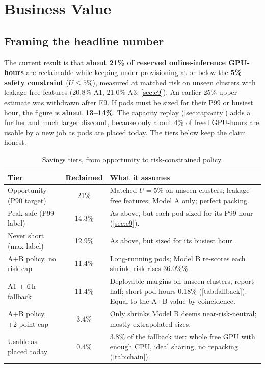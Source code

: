 \section{Business Value}
\label{sec:value}

\subsection{Framing the headline number}
The current result is that \textbf{about 21\% of reserved online-inference GPU-hours} are reclaimable while keeping under-provisioning at or below the \textbf{5\% safety constraint} ($U \le 5\%$), measured at matched risk on unseen clusters with leakage-free features (20.8\% A1, 21.0\% A3; \cref{sec:e9}). An earlier 25\% upper estimate was withdrawn after E9. If pods must be sized for their P99 or busiest hour, the figure is \textbf{about 13--14\%}. The capacity replay (\cref{sec:capacity}) adds a further and much larger discount, because only about 4\% of freed GPU-hours are usable by a new job as pods are placed today. The tiers below keep the claim honest:

\begin{table}[h]
\centering\small
\caption{Savings tiers, from opportunity to risk-constrained policy.}
\label{tab:tiers}
\begin{tabularx}{\linewidth}{@{}p{4.1cm}cL@{}}
\toprule
Tier & Reclaimed & What it assumes \\
\midrule
Opportunity (P90 target) & 21\% & Matched $U=5\%$ on unseen clusters; leakage-free features; Model A only; perfect packing. \\
Peak-safe (P99 label) & 14.3\% & As above, but each pod sized for its P99 hour (\cref{sec:e9}). \\
Never short (max label) & 12.9\% & As above, but sized for its busiest hour. \\
A+B policy, no risk cap & 11.4\% & Long-running pods; Model B re-scores each shrink; risk rises 36.0\%\%. \\
A1 + 6\,h fallback & 11.4\% & Deployable margins on unseen clusters, report half; short pod-hours 0.18\% (\cref{tab:fallback}). Equal to the A+B value by coincidence. \\
A+B policy, +2-point cap & 3.4\% & Only shrinks Model B deems near-risk-neutral; mostly extrapolated sizes. \\
Usable as placed today & 0.4\% & 3.8\% of the fallback tier: whole free GPU with enough CPU, ideal sharing, no repacking (\cref{tab:chain}). \\
\bottomrule
\end{tabularx}
\end{table}

